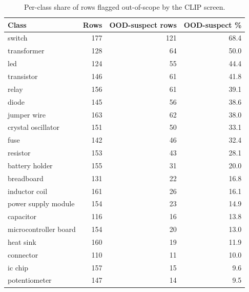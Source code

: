 \begin{table}[t]
\centering\small
\caption{Per-class share of rows flagged out-of-scope by the CLIP screen.}
\label{tab:ood_per_class}
\begin{tabular}{lrrr}
\toprule
Class & Rows & OOD-suspect rows & OOD-suspect \% \\
\midrule
switch & 177 & 121 & 68.4 \\
transformer & 128 & 64 & 50.0 \\
led & 124 & 55 & 44.4 \\
transistor & 146 & 61 & 41.8 \\
relay & 156 & 61 & 39.1 \\
diode & 145 & 56 & 38.6 \\
jumper wire & 163 & 62 & 38.0 \\
crystal oscillator & 151 & 50 & 33.1 \\
fuse & 142 & 46 & 32.4 \\
resistor & 153 & 43 & 28.1 \\
battery holder & 155 & 31 & 20.0 \\
breadboard & 131 & 22 & 16.8 \\
inductor coil & 161 & 26 & 16.1 \\
power supply module & 154 & 23 & 14.9 \\
capacitor & 116 & 16 & 13.8 \\
microcontroller board & 154 & 20 & 13.0 \\
heat sink & 160 & 19 & 11.9 \\
connector & 110 & 11 & 10.0 \\
ic chip & 157 & 15 & 9.6 \\
potentiometer & 147 & 14 & 9.5 \\
\bottomrule
\end{tabular}
\end{table}
